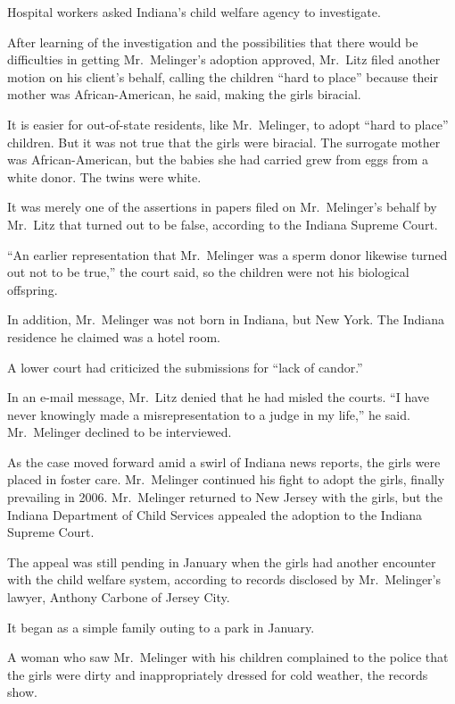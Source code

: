 ﻿\documentclass[12pt]{article}
\begin{document}
Hospital workers asked Indiana's child welfare agency to investigate.

After learning of the investigation and the possibilities that there would be difficulties in
getting Mr.~Melinger's adoption approved, Mr.~Litz filed another motion on his client's behalf,
calling the children ``hard to place'' because their mother was African-American, he said, making
the girls biracial.

It is easier for out-of-state residents, like Mr.~Melinger, to adopt ``hard to place'' children. But
it was not true that the girls were biracial. The surrogate mother was African-American, but the
babies she had carried grew from eggs from a white donor. The twins were white.

It was merely one of the assertions in papers filed on Mr.~Melinger's behalf by Mr.~Litz that turned
out to be false, according to the Indiana Supreme Court.

``An earlier representation that Mr.~Melinger was a sperm donor likewise turned out not to be
true,'' the court said, so the children were not his biological offspring.

In addition, Mr.~Melinger was not born in Indiana, but New York. The Indiana residence he claimed
was a hotel room.

A lower court had criticized the submissions for ``lack of candor.''

In an e-mail message, Mr.~Litz denied that he had misled the courts. ``I have never knowingly made a
misrepresentation to a judge in my life,'' he said. Mr.~Melinger declined to be interviewed.

As the case moved forward amid a swirl of Indiana news reports, the girls were placed in foster
care. Mr.~Melinger continued his fight to adopt the girls, finally prevailing in 2006. Mr.~Melinger
returned to New Jersey with the girls, but the Indiana Department of Child Services appealed the
adoption to the Indiana Supreme Court.

The appeal was still pending in January when the girls had another encounter with the child welfare
system, according to records disclosed by Mr.~Melinger's lawyer, Anthony Carbone of Jersey City.

It began as a simple family outing to a park in January.

A woman who saw Mr.~Melinger with his children complained to the police that the girls were dirty
and inappropriately dressed for cold weather, the records show.
\end{document}
